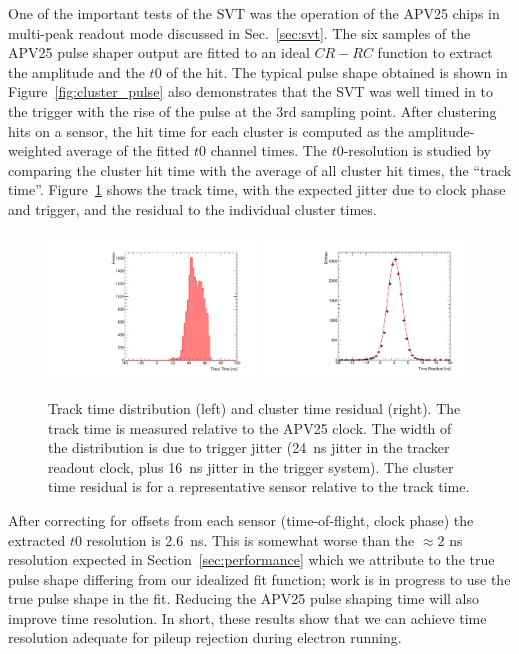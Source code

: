 One of the important tests of the SVT was the operation of the APV25 chips in multi-peak readout mode 
discussed in Sec.~\ref{sec:svt}. The six samples of the APV25 pulse shaper output 
are fitted to an ideal $CR-RC$ function to extract the amplitude and the $t0$ of the hit. 
The typical pulse shape obtained is shown in Figure~\ref{fig:cluster_pulse} also demonstrates that the SVT was well timed in to the trigger with the rise of the pulse at the 3rd sampling point.
After clustering hits on a sensor, the hit time for each cluster is computed as the amplitude-weighted average of 
the fitted $t0$ channel times. The $t0$-resolution is studied by comparing the cluster hit time with the average of all cluster hit times, the ``track time''. Figure~\ref{fig:tracktime} shows the track time, with the expected jitter due to clock phase and trigger, and the residual to the individual cluster times. 
\begin{figure}[ht]
	\includegraphics[width=0.49\textwidth]{test2012/svtperformance/top_track_time.pdf}
	\includegraphics[width=0.49\textwidth]{test2012/svtperformance/t0_resolution.pdf}
	\caption{\small{Track time distribution (left) and cluster time residual (right). The 
	track time is measured relative to the APV25 clock. The width of the distribution is due to 
	trigger jitter (24~ns jitter in the tracker readout clock, plus 16~ns jitter in the trigger system). 
	The cluster time residual is for a representative sensor relative to the track time.}}
	\label{fig:tracktime}
\end{figure}
After correcting for offsets from each sensor (time-of-flight, clock phase) the extracted $t0$ resolution is 2.6~ns. This is somewhat worse than the $\approx 2$ ns resolution expected in Section~\ref{sec:performance} which we attribute to the true pulse shape differing from our idealized fit function; work is in progress to use the true pulse shape in the fit.
Reducing the APV25 pulse shaping time will also improve time resolution.
In short, these results show that we can achieve time resolution adequate for pileup rejection during electron running.



